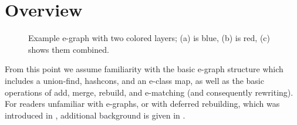 \section{Overview}
\label{chap:colored-egraph}
\label{colors:overview}


\begin{figure}[t]
  \centering
\begin{comment}
  \node(black)[label={above:$\cong$},
               label={[sub]below:{\small (a)}}] {
    \texttt{[image: gfx/egraph-max.png]}
  };
\end{comment}

  \vspace{-1.5em}
  \caption{Example e-graph with two colored layers; (a) is blue, (b) is red, (c) shows them combined.}
  \label{overview:egraph-max}
\end{figure}

From this point we assume familiarity with the basic e-graph structure which includes a union-find, hashcons, and an e-class map, as well as the basic operations of add, merge, rebuild, and e-matching (and consequently rewriting).
For readers unfamiliar with e-graphs, or with deferred rebuilding, which was introduced in \cite{egg}, additional background is given in  . 


